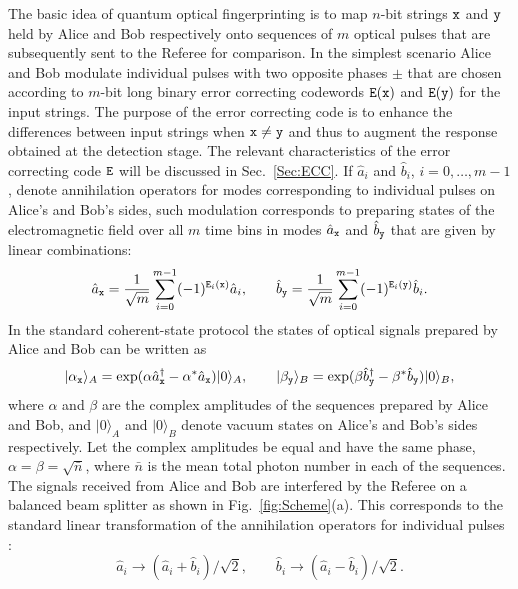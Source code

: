 \documentclass[10pt]{article}
\newcommand{\ket}[2][]{{|#2\rangle_{#1}}}
\begin{document}
The basic idea of quantum optical fingerprinting \cite{Luthenhaus2014} is to map $n$-bit strings ${\tt x}$ and ${\tt y}$ held by Alice and Bob respectively onto sequences of $m$ optical pulses that are subsequently sent to the Referee for comparison. In the simplest scenario Alice and Bob modulate individual pulses with two opposite phases $\pm$ that are chosen according to $m$-bit long binary error correcting codewords ${\tt E}({\tt x})$ and ${\tt E}({\tt y})$ for the input strings. The purpose of the error correcting code is to enhance the differences between input strings when ${\tt x} \neq {\tt y}$ and thus to augment the response obtained at the detection stage. The relevant characteristics of the error correcting code ${\tt E}$ will be discussed in Sec.~\ref{Sec:ECC}. If $\hat{a}_i$ and $\hat{b}_i$, $i=0,\ldots,m-1$, denote annihilation operators for modes corresponding to individual pulses on Alice's and Bob's sides, such modulation corresponds to preparing states of the electromagnetic field  over all $m$ time bins in modes $\hat{a}_{\tt x}$ and $\hat{b}_{\tt y}$ that are given by linear combinations:
\begin{equation}
\hat{a}_{\tt x} = \frac{1}{\sqrt{m}}\sum_{i=0}^{m-1} (-1)^{{\tt E}_i({\tt x})} \hat{a}_i ,
\qquad \hat{b}_{\tt y} = \frac{1}{\sqrt{m}}\sum_{i=0}^{m-1} (-1)^{{\tt E}_i({\tt y})} \hat{b}_i.
\end{equation}
In the standard coherent-state protocol \cite{Luthenhaus2014} the states of optical signals prepared by Alice and Bob can be written as
\begin{equation}
 \ket[A]{\alpha_{\tt x}} = \exp(\alpha\hat{a}_{\tt x}^\dagger - \alpha^\ast \hat{a}_{\tt x}) \ket[A]{0}, \qquad  \ket[B]{\beta_{\tt y}} = \exp(\beta\hat{b}_{\tt y}^\dagger - \beta^\ast \hat{b}_{\tt y}) \ket[B]{0},
\label{Eq:InputState}
\end{equation}
where $\alpha$ and $\beta$ are the complex amplitudes of the sequences prepared by Alice and Bob, and $\ket[A]{0}$ and $\ket[B]{0}$ denote vacuum states on Alice's and Bob's sides respectively. Let the complex amplitudes be equal and have the same phase, $\alpha= \beta=\sqrt{\bar{n}}$, where $\bar{n}$ is the mean total photon number in each of the sequences. The signals received from Alice and Bob are interfered by the Referee on a balanced beam splitter as shown in Fig.~\ref{fig:Scheme}(a). This corresponds to the standard linear transformation of the annihilation operators for individual pulses \cite{GerryKnight}:
\begin{equation}
\hat{a}_i \rightarrow (\hat{a}_i + \hat{b}_i)/\sqrt{2}, \qquad \hat{b}_i \rightarrow (\hat{a}_i - \hat{b}_i)/\sqrt{2}.
\label{Eq:BeamSplitterTransformation}
\end{equation}
\end{document}
